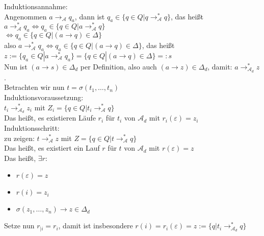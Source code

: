 \documentclass[titlepage]{article}
\begin{document}
Induktionsannahme:\\
Angenommen $a \rightarrow _\mathcal{A} q_a$, dann ist 
$q_a \in \{ q \in Q | q \rightarrow ^\ast_\mathcal{A} q\}$, das hei\ss t\\
$a \rightarrow ^\ast_\mathcal{A} q_a \Leftrightarrow q_a \in 
\{ q \in Q | a \rightarrow ^\ast_\mathcal{A} q \}$\\
$\Leftrightarrow q_a \in \{ q \in Q | (a \rightarrow q) \in \Delta \}$\\
also $a \rightarrow ^\ast_\mathcal{A} q_a \Leftrightarrow q_a \in 
\{ q \in Q | (a \rightarrow q) \in \Delta \}$, das hei\ss t\\
$z := \{ q_a \in Q | a \rightarrow ^\ast_\mathcal{A} q_a \} = 
\{ q \in Q | (a \rightarrow q) \in \Delta \} =: s$\\

Nun ist $( a \rightarrow s) \in \Delta_d$ per Definition, also auch 
$( a \rightarrow z) \in \Delta_d$, damit: $a \rightarrow ^\ast_{\mathcal{A}_d} z$.\\

Betrachten wir nun $ t = \sigma(t_1, \dots , t_n) $ \\

Induktionsvoraussetzung:\\
$t_i \rightarrow ^\ast_{\mathcal{A}_d} z_i$ mit $Z_i = 
\{q \in Q | t_i \rightarrow ^\ast_\mathcal{A} q\}$\\
Das hei\ss t, es existieren L\"aufe $r_i$ f\"ur $t_i$ von $\mathcal{A}_d$ mit 
$r_i(\varepsilon) = z_i$\\

Induktionsschritt:\\
zu zeigen: $ t \rightarrow ^\ast_\mathcal{A} z$ mit $Z = 
\{ q \in Q | t \rightarrow ^\ast_\mathcal{A} q \} $ \\
Das hei\ss t, es existiert ein Lauf $r$ f\"ur $t$ von $\mathcal{A}_d$ mit 
$r(\varepsilon) = z$\\
Das hei\ss t, $\exists r :$\\

\begin{itemize}
    \item $r (\varepsilon) = z$
    \item $r (i) = z_i$
    \item $\sigma (z_1, \dots, z_n) \rightarrow z \in \Delta_d$
\end{itemize}

Setze nun $r_{ |i } = r_i$, damit ist insbesondere 
$r(i) = r_i(\varepsilon) = z := \{q | t_i \rightarrow ^\ast_{\mathcal{A}_d} q \}$\\
\end{document}
